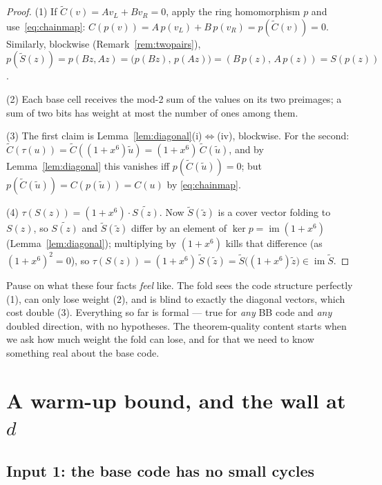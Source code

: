 \documentclass[11pt]{article}
\theoremstyle{plain}
\theoremstyle{definition}
\theoremstyle{remark}
\begin{document}
\begin{proof}
(1) If $\widetilde C(v) = A v_L + B v_R = 0$, apply the ring homomorphism $p$
and use~\eqref{eq:chainmap}: $C(p(v)) = A\,p(v_L) + B\,p(v_R) = p(\widetilde
C(v)) = 0$. Similarly, blockwise (Remark~\ref{rem:twopairs}),
$p(\widetilde S(z)) = p(Bz, Az) = \bigl(p(Bz),\, p(Az)\bigr) =
(B\,p(z),\, A\,p(z)) = S(p(z))$.

(2) Each base cell receives the mod-2 sum of the values on its two preimages;
a sum of two bits has weight at most the number of ones among them.

(3) The first claim is Lemma~\ref{lem:diagonal}(i)$\Leftrightarrow$(iv),
blockwise. For the second: $\widetilde C(\tau(u)) = \widetilde
C((1+x^6)\widetilde u) = (1+x^6)\,\widetilde C(\widetilde u)$, and by
Lemma~\ref{lem:diagonal} this vanishes iff $p(\widetilde C(\widetilde u)) =
0$; but $p(\widetilde C(\widetilde u)) = C(p(\widetilde u)) = C(u)$ by
\eqref{eq:chainmap}.

(4) $\tau(S(z)) = (1+x^6)\cdot\widetilde{S(z)}$. Now $\widetilde S(\widetilde
z)$ is a cover vector folding to $S(z)$, so $\widetilde{S(z)}$ and $\widetilde
S(\widetilde z)$ differ by an element of $\ker p = \operatorname{im}(1+x^6)$
(Lemma~\ref{lem:diagonal}); multiplying by $(1+x^6)$ kills that difference
(as $(1+x^6)^2 = 0$), so
$\tau(S(z)) = (1+x^6)\,\widetilde S(\widetilde z) = \widetilde
S\bigl((1+x^6)\widetilde z\bigr) \in \operatorname{im}\widetilde S$.
\end{proof}

Pause on what these four facts \emph{feel} like. The fold sees the code
structure perfectly (1), can only lose weight (2), and is blind to exactly the
diagonal vectors, which cost double (3). Everything so far is formal --- true
for \emph{any} BB code and \emph{any} doubled direction, with no hypotheses.
The theorem-quality content starts when we ask how much weight the fold can
lose, and for that we need to know something real about the base code.

\section{A warm-up bound, and the wall at \texorpdfstring{$d$}{d}}
\label{sec:warmup}

\subsection{Input 1: the base code has no small cycles}
\end{document}
